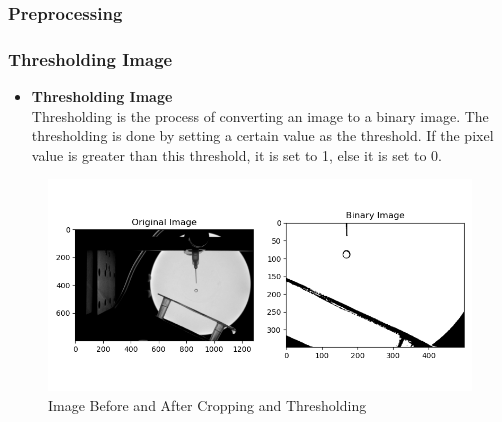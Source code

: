 \documentclass{beamer}
\begin{document}
\begin{frame}
    \frametitle{Preprocessing}
    \subsubsection[]{Thresholding Image}
    \begin{itemize}
        \item <1-> \textbf{Thresholding Image}\\ Thresholding is the process of converting an image to a binary image. The thresholding is done by setting a certain value as the threshold. If the pixel value is greater than this threshold, it is set to 1, else it is set to 0.
    \end{itemize}
    \begin{figure}
        \centering
        \includegraphics[scale=0.4]{binary.png}
        \caption[]{Image Before and After Cropping and Thresholding}
    \end{figure}
\end{frame}
\end{document}
